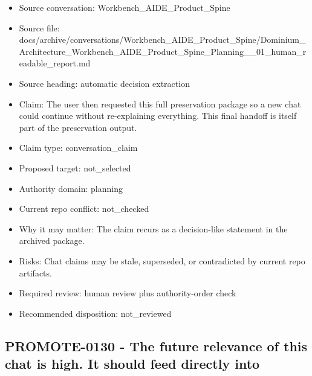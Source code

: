 \documentclass[11pt,a4paper]{report}
\begin{document}
\begin{itemize}
\item Source conversation: Workbench\_AIDE\_Product\_Spine
\item Source file: docs/archive/conversations/Workbench\_AIDE\_Product\_Spine/Dominium\_Architecture\_Workbench\_AIDE\_Product\_Spine\_Planning\_\_01\_human\_readable\_report.md
\item Source heading: automatic decision extraction
\item Claim: The user then requested this full preservation package so a new chat could continue without re-explaining everything. This final handoff is itself part of the preservation output.
\item Claim type: conversation\_claim
\item Proposed target: not\_selected
\item Authority domain: planning
\item Current repo conflict: not\_checked
\item Why it may matter: The claim recurs as a decision-like statement in the archived package.
\item Risks: Chat claims may be stale, superseded, or contradicted by current repo artifacts.
\item Required review: human review plus authority-order check
\item Recommended disposition: not\_reviewed
\end{itemize}

\subsection{PROMOTE-0130 - The future relevance of this chat is high. It should feed directly into}
\end{document}
